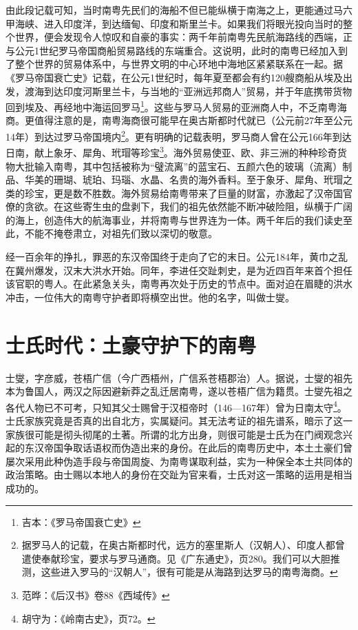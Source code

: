 由此段记载可知，当时南粤先民们的海船不但已能纵横于南海之上，更能通过马六甲海峡、进入印度洋，到达缅甸、印度和斯里兰卡。如果我们将眼光投向当时的整个世界，便会发现令人惊叹和自豪的事实：两千年前南粤先民航海路线的西端，正与公元1世纪罗马帝国商船贸易路线的东端重合。这说明，此时的南粤已经加入到了整个世界的贸易体系中，与世界文明的中心环地中海地区紧紧联系在一起。据《罗马帝国衰亡史》记载，在公元1世纪时，每年夏至都会有约120艘商船从埃及出发，渡海到达印度河斯里兰卡，与当地的“亚洲远邦商人”贸易，并于年底携带货物回到埃及、再经地中海运回罗马\footnote{吉本：《罗马帝国衰亡史》}。这些与罗马人贸易的亚洲商人中，不乏南粤海商。更值得注意的是，南粤海商很可能早在奥古斯都时代就已（公元前27年至公元14年）到达过罗马帝国境内\footnote{据罗马人的记载，在奥古斯都时代，远方的塞里斯人（汉朝人）、印度人都曾遣使奉献珍宝，要求与罗马通商。见《广东通史》，页280。我们可以大胆推测，这些进入罗马的“汉朝人”，很有可能是从海路到达罗马的南粤海商。}。更有明确的记载表明，罗马商人曾在公元166年到达日南，献上象牙、犀角、玳瑁等珍宝\footnote{范晔：《后汉书》卷88《西域传》}。海外贸易使亚、欧、非三洲的种种珍奇货物大批输入南粤，其中包括被称为“璧流离”的蓝宝石、五颜六色的玻璃（流离）制品、华美的珊瑚、琥珀、玛瑙、水晶、名贵的海外香料。至于象牙、犀角、玳瑁之类的珍宝，更是数不胜数。海外贸易给南粤带来了巨量的财富，亦激起了汉帝国官僚的贪欲。在这些寄生虫的盘剥下，我们的祖先依然能不断冲破险阻，纵横于广阔的海上，创造伟大的航海事业，并将南粤与世界连为一体。两千年后的我们读史至此，不能不掩卷肃立，对祖先们致以深切的敬意。

经一百余年的挣扎，罪恶的东汉帝国终于走向了它的末日。公元184年，黄巾之乱在冀州爆发，汉末大洪水开始。同年，李进任交趾刺史，是为近四百年来首个担任该官职的粤人。在此紧急关头，南粤再次处于历史的节点中。面对迫在眉睫的洪水冲击，一位伟大的南粤守护者即将横空出世。他的名字，叫做士燮。

\section{士氏时代：土豪守护下的南粤}

\indent 士燮，字彦威，苍梧广信（今广西梧州，广信系苍梧郡治）人。据说，士燮的祖先本为鲁国人，两汉之际因避新莽之乱迁居南粤，遂以苍梧广信为籍贯。士燮先祖之各代人物已不可考，只知其父士赐曾于汉桓帝时（146—167年）曾为日南太守\footnote{胡守为：《岭南古史》，页72。}。士氏家族究竟是否真的出自北方，实属疑问。其无法考证的祖先谱系，暗示了这一家族很可能是彻头彻尾的土著。所谓的北方出身，则很可能是士氏为在门阀观念兴起的东汉帝国争取话语权而伪造出来的身份。在此后的南粤历史中，本土土豪们曾屡次采用此种伪造手段与帝国周旋、为南粤谋取利益，实为一种保全本土共同体的政治策略。由士赐以本地人的身份在交趾为官来看，士氏对这一策略的运用是相当成功的。

